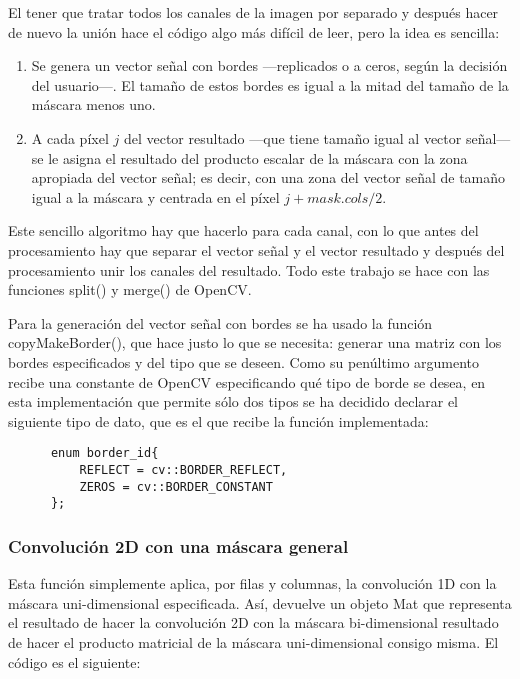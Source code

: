 \documentclass[a4paper, 11pt]{article}
\theoremstyle{definition}
\theoremstyle{theorem}
\begin{document}
  El tener que tratar todos los canales de la imagen por separado y después hacer de nuevo la unión hace el código algo más difícil de leer, pero la idea es sencilla:
  \begin{enumerate}
      \item Se genera un vector señal con bordes ---replicados o a ceros, según la decisión del usuario---. El tamaño de estos bordes es igual a la mitad del tamaño de la máscara menos uno.
      \item A cada píxel $j$ del vector resultado ---que tiene tamaño igual al vector señal--- se le asigna el resultado del producto escalar de la máscara con la zona apropiada del vector señal; es decir, con una zona del vector señal de tamaño igual a la máscara y centrada en el píxel $j+mask.cols/2$.
  \end{enumerate}

  Este sencillo algoritmo hay que hacerlo para cada canal, con lo que antes del procesamiento hay que separar el vector señal y el vector resultado y después del procesamiento unir los canales del resultado. Todo este trabajo se hace con las funciones split() y merge() de OpenCV.

  Para la generación del vector señal con bordes se ha usado la función copyMakeBorder(), que hace justo lo que se necesita: generar una matriz con los bordes especificados y del tipo que se deseen. Como su penúltimo argumento recibe una constante de OpenCV especificando qué tipo de borde se desea, en esta implementación que permite sólo dos tipos se ha decidido declarar el siguiente tipo de dato, que es el que recibe la función implementada:

  \begin{lstlisting}
      enum border_id{
          REFLECT = cv::BORDER_REFLECT,
          ZEROS = cv::BORDER_CONSTANT
      };
  \end{lstlisting}

  \subsubsection*{Convolución 2D con una máscara general}

  Esta función simplemente aplica, por filas y columnas, la convolución 1D con la máscara uni-dimensional especificada. Así, devuelve un objeto Mat que representa el resultado de hacer la convolución 2D con la máscara bi-dimensional resultado de hacer el producto matricial de la máscara uni-dimensional consigo misma. El código es el siguiente:
\end{document}
